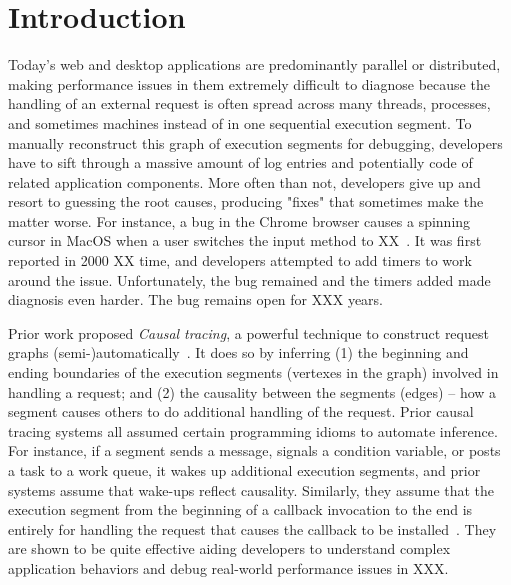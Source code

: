 \section{Introduction} \label{sec:intro}
%

%

Today's web and desktop applications are predominantly parallel or
distributed, making performance issues in them extremely difficult to
diagnose because the handling of an external request is often spread
across many threads, processes, and sometimes machines instead of in one
sequential execution segment.  To manually reconstruct this graph of
execution segments for debugging, developers have to sift through a
massive amount of log entries and potentially code of related application
components.  More often than not, developers give up and resort to
guessing the root causes, producing "fixes" that sometimes make the matter
worse.  For instance, a bug in the Chrome browser causes a spinning cursor
in MacOS when a user switches the input method to XX~\cite{bug-url}.  It
was first reported in 2000 XX time, and developers attempted to add timers
to work around the issue.  Unfortunately, the bug remained and the timers
added made diagnosis even harder.  The bug remains open for XXX years.

Prior work proposed \emph{Causal tracing}, a powerful technique to
construct request graphs (semi-)automatically~\cite{xxx}. It does so by
inferring (1) the beginning and ending boundaries of the execution
segments (vertexes in the graph) involved in handling a request; and (2)
the causality between the segments (edges) -- how a segment causes others
to do additional handling of the request.  Prior causal tracing systems
all assumed certain programming idioms to automate inference.  For
instance, if a segment sends a message, signals a condition variable, or
posts a task to a work queue, it wakes up additional execution segments,
and prior systems assume that wake-ups reflect causality.  Similarly, they
assume that the execution segment from the beginning of a callback
invocation to the end is entirely for handling the request that causes the
callback to be installed~\cite{}.  They are shown to be quite effective
aiding developers to understand complex application behaviors and debug
real-world performance issues in XXX.

